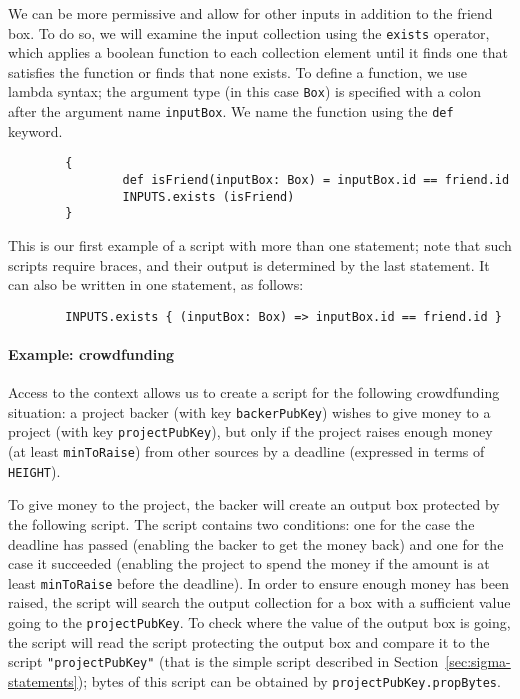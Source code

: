 \documentclass[11pt]{article}
\begin{document}
We can be more permissive and allow for other inputs in addition to the friend box. To do so, we will examine the input collection using the \texttt{exists} operator, which applies a boolean function to each collection element until it finds one that satisfies the function or finds that none exists. To define a function, we use lambda syntax; the argument type (in this case \texttt{Box}) is specified with a colon after the argument name \texttt{inputBox}. We name the function using the \texttt{def} keyword.
\begin{verbatim}
        {
                def isFriend(inputBox: Box) = inputBox.id == friend.id
                INPUTS.exists (isFriend)
        }
\end{verbatim}

This is our first example of a script with more than one statement; note that such scripts require braces, and their output is determined by the last statement.
It can also be written in one statement, as follows:
\begin{verbatim}
        INPUTS.exists { (inputBox: Box) => inputBox.id == friend.id }
\end{verbatim}


\paragraph{Example: crowdfunding}
Access to the context allows us to create a script for the following crowdfunding situation: a project backer (with key  \texttt{backerPubKey}) wishes to give money to a project (with key \texttt{projectPubKey}), but only if the project raises enough money (at least \texttt{minToRaise}) from other sources by a deadline (expressed in terms of \texttt{HEIGHT}).

To give money to the project, the backer will create an output box protected by the following script. The script contains two conditions: one for the case the deadline has passed (enabling the backer to get the money back) and one for the case it succeeded (enabling the project to spend the money if the amount is at least \texttt{minToRaise} before the deadline).  In order to ensure enough money has been raised, the script will search the output collection for a box with a sufficient value going to the \texttt{projectPubKey}. To check where the value of the output box is going, the script will read the script protecting the output box and compare it to the script \texttt{"projectPubKey"} (that is the simple script described in Section~\ref{sec:sigma-statements}); bytes of this script can be obtained by \texttt{projectPubKey.propBytes}.
\end{document}
